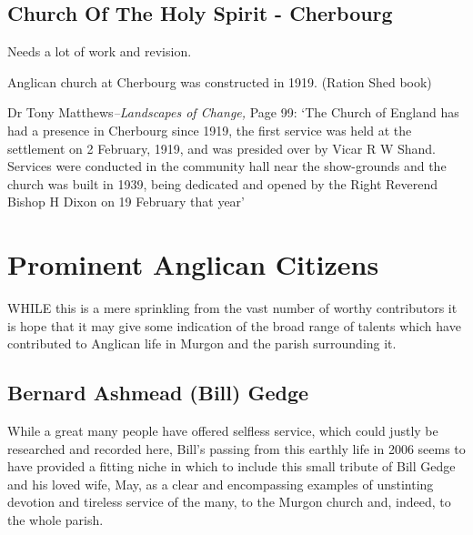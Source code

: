 \section{Church Of The Holy Spirit - Cherbourg}



Needs a lot of work and revision.



Anglican church at Cherbourg was constructed in 1919. (Ration Shed book)



Dr Tony Matthews\emph{--Landscapes of Change,} Page 99: `The Church of England has had a presence in Cherbourg since 1919, the first service was held at the settlement on 2 February, 1919, and was presided over by Vicar R W Shand. Services were conducted in the community hall near the show-grounds and the church was built in 1939, being dedicated and opened by the Right Reverend Bishop H Dixon on 19 February that year'

\balance


\chapter{Prominent Anglican Citizens}
\nobalance


\lettrine[lines=3]{W}{HILE}
 this is a mere sprinkling from the vast number of worthy contributors it is hope that it may give some indication of the broad range of talents which have contributed to Anglican life in Murgon and the parish surrounding it.

\section{Bernard Ashmead (Bill) Gedge}



While a great many people have offered selfless service, which could justly be researched and recorded here, Bill's passing from this earthly life in 2006 seems to have provided a fitting niche in which to include this small tribute of Bill Gedge and his loved wife, May, as a clear and encompassing examples of unstinting devotion and tireless service of the many, to the Murgon church and, indeed, to the whole parish.









